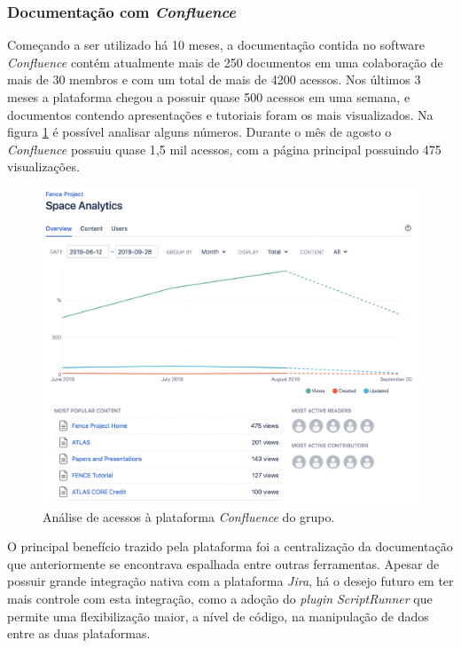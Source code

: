\hypertarget{documentacao-com-confluence}{%
\subsubsection{\texorpdfstring{Documentação com \emph{Confluence}}{Documentação com Confluence}}\label{documentacao-com-confluence}}

Começando a ser utilizado há 10 meses, a documentação contida no software \emph{Confluence} contém atualmente mais de 250 documentos em uma colaboração de mais de 30 membros e com um total de mais de 4200 acessos. Nos últimos 3 meses a plataforma chegou a possuir quase 500 acessos em uma semana, e documentos contendo apresentações e tutoriais foram os mais visualizados. Na figura \ref{fig:space-analytics} é possível analisar alguns números. Durante o mês de agosto o \emph{Confluence} possuiu quase 1,5 mil acessos, com a página principal possuindo 475 visualizações.

\begin{figure}[H]
    \centering
    \includegraphics[width=15cm]{source/5-resultados/images/space-analytics-censored.png}
    \caption{Análise de acessos à plataforma \emph{Confluence} do grupo.}
    \label{fig:space-analytics}
\end{figure}

O principal benefício trazido pela plataforma foi a centralização da documentação que anteriormente se encontrava espalhada entre outras ferramentas. Apesar de possuir grande integração nativa com a plataforma \emph{Jira}, há o desejo futuro em ter mais controle com esta integração, como a adoção do \emph{plugin} \emph{ScriptRunner} que permite uma flexibilização maior, a nível de código, na manipulação de dados entre as duas plataformas.

